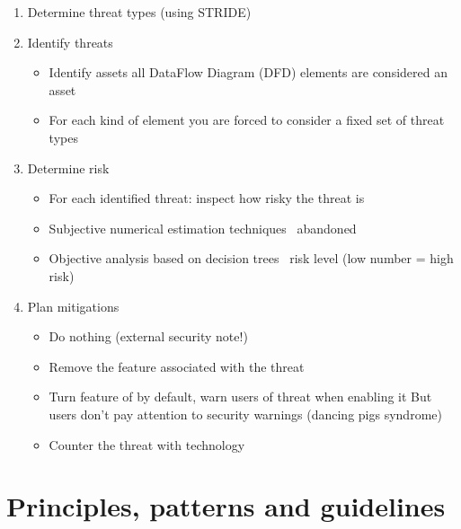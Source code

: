 \documentclass[12pt,titlepage,a4paper]{report}
\begin{document}
\begin{enumerate}
\begin{itemize}
				\end{itemize}
				\item Determine threat types (using STRIDE)
				\item Identify threats
				\begin{itemize}
					\item Identify assets
						\subitem all DataFlow Diagram (DFD) elements are considered an asset
					\item For each kind of element you are forced to consider a fixed set of threat types
				\end{itemize}
				\item Determine risk
				\begin{itemize}
					\item For each identified threat: inspect how risky the threat is
					\item Subjective numerical estimation techniques \textrightarrow \, abandoned
					\item Objective analysis based on decision trees \textrightarrow \, risk level (low number = high risk)
				\end{itemize}
				\item Plan mitigations
				\begin{itemize}
					\item Do nothing (external security note!)
					\item Remove the feature associated with the threat
					\item Turn feature of by default, warn users of threat when enabling it
						\subitem But users don't pay attention to security warnings (dancing pigs syndrome)
					\item Counter the threat with technology
				\end{itemize}
			\end{enumerate}

		\section{Principles, patterns and guidelines}
\end{document}
